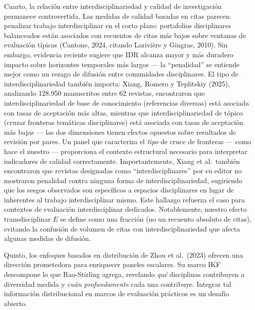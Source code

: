 \documentclass[
]{article}
\begin{document}
Cuarto, la relación entre interdisciplinariedad y calidad de
investigación permanece controvertida. Las medidas de calidad basadas en
citas parecen penalizar trabajo interdisciplinar en el corto plazo:
portafolios disciplinares balanceados están asociados con recuentos de
citas más bajos sobre ventanas de evaluación típicas (Cantone, 2024,
citando Larivière y Gingras, 2010). Sin embargo, evidencia reciente
sugiere que IDR alcanza mayor y más duradero impacto sobre horizontes
temporales más largos --- la ``penalidad'' se entiende mejor como un
rezago de difusión entre comunidades disciplinares. El tipo de
interdisciplinariedad también importa: Xiang, Romero y Teplitskiy
(2025), analizando 128.950 manuscritos entre 62 revistas, encontraron
que interdisciplinariedad de base de conocimiento (referencias diversas)
está asociada con tasas de aceptación más altas, mientras que
interdisciplinariedad de tópico (cruzar fronteras temáticas
disciplinares) está asociada con tasas de aceptación más bajas --- las
dos dimensiones tienen efectos opuestos sobre resultados de revisión por
pares. Un panel que caracteriza el \emph{tipo} de cruce de fronteras ---
como hace el nuestro --- proporciona el contexto estructural necesario
para interpretar indicadores de calidad correctamente. Importantemente,
Xiang et al.~también encontraron que revistas designadas como
``interdisciplinares'' por su editor no mostraron penalidad contra
ninguna forma de interdisciplinariedad, sugiriendo que los sesgos
observados son específicos a espacios disciplinares en lugar de
inherentes al trabajo interdisciplinar mismo. Este hallazgo refuerza el
caso para contextos de evaluación interdisciplinar dedicados.
Notablemente, nuestro efecto transdisciplinar \(E\) se define como una
fracción (no un recuento absoluto de citas), evitando la confusión de
volumen de citas con interdisciplinariedad que afecta algunas medidas de
difusión.

Quinto, los enfoques basados en distribución de Zhou et al.~(2023)
ofrecen una dirección prometedora para enriquecer paneles escalares. Su
marco IKF descompone lo que Rao-Stirling agrega, revelando \emph{qué}
disciplinas contribuyen a diversidad medida y \emph{cuán profundamente}
cada una contribuye. Integrar tal información distribucional en marcos
de evaluación prácticos es un desafío abierto.
\end{document}
